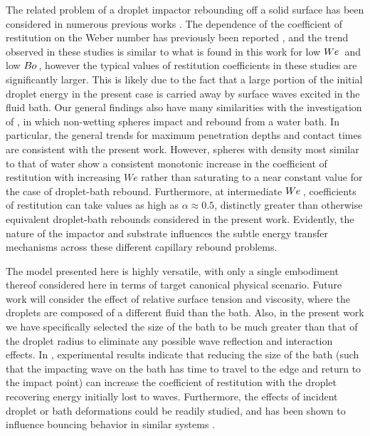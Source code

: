 \documentclass{jfm}
\begin{document}
The related problem of a droplet impactor rebounding off a solid surface has been considered in numerous previous works \citep{anders1993velocity,richard2000bouncing,richard2002contact,gilet2012droplets}. The dependence of the coefficient of restitution on the Weber number has previously been reported \citep{biance2006elasticity,aussillous2006properties,gilet2012droplets}, and the trend observed in these studies is similar to what is found in this work for low $W\kern-0.03em e\,$ and low $B\kern-0.04em o\,$, however the typical values of restitution coefficients in these studies are significantly larger. This is likely due to the fact that a large portion of the initial droplet energy in the present case is carried away by surface waves excited in the fluid bath. Our general findings also have many similarities with the investigation of \citet{galeano2021capillary}, in which non-wetting spheres impact and rebound from a water bath.  In particular, the general trends for maximum penetration depths and contact times are consistent with the present work.  However, spheres with density most similar to that of water show a consistent monotonic increase in the coefficient of restitution with increasing $We$ rather than saturating to a near constant value for the case of droplet-bath rebound.  Furthermore, at intermediate $W\kern-0.03em e\,$, coefficients of restitution can take values as high as $\alpha \approx 0.5$, distinctly greater than otherwise equivalent droplet-bath rebounds considered in the present work.  Evidently, the nature of the impactor and substrate influences the subtle energy transfer mechanisms across these different capillary rebound problems.

The model presented here is highly versatile, with only a single embodiment thereof considered here in terms of target canonical physical scenario.  Future work will consider the effect of relative surface tension and viscosity, where the droplets are composed of a different fluid than the bath. Also, in the present work we have specifically selected the size of the bath to be much greater than that of the droplet radius to eliminate any possible wave reflection and interaction effects. In \cite{zou2013phenomena}, experimental results indicate that reducing the size of the bath (such that the impacting wave on the bath has time to travel to the edge and return to the impact point) can increase the coefficient of restitution with the droplet recovering energy initially lost to waves.  Furthermore, the effects of incident droplet or bath deformations could be readily studied, and has been shown to influence bouncing behavior in similar systems \citep{biance2006elasticity,yun2018impact}.
\end{document}
